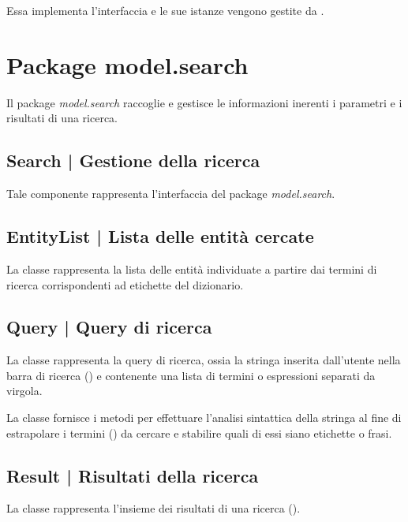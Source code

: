 \documentclass[10pt,a4paper,headinclude,footinclude,hidelinks]{scrreprt} %
\begin{document}
	Essa implementa l'interfaccia \textit{} e le sue istanze vengono gestite da \textit{}.

	\section{Package model.search}
	\label{sec:stage:design:sistema:model.search}
	Il package \textit{model.search} raccoglie e gestisce le informazioni inerenti i parametri e i risultati di una ricerca. 

	\subsection[Search]{Search | Gestione della ricerca}
	\label{sec:stage:design:sistema:model.search:search}
	Tale componente rappresenta l'interfaccia del package \textit{model.search}.

	\subsection[EntityList]{EntityList | Lista delle entità cercate}
	\label{sec:stage:design:sistema:model.search:search-entity-list}
	La classe \textit{} rappresenta la lista delle entità individuate a partire dai termini di ricerca corrispondenti ad etichette del dizionario.

	\subsection[Query]{Query | Query di ricerca}
	\label{sec:stage:design:sistema:model.search:search-query}
	La classe \textit{} rappresenta la query di ricerca, ossia la stringa inserita dall'utente nella barra di ricerca (\textit{}) e contenente una lista di termini o espressioni separati da virgola.

	La classe fornisce i metodi per effettuare l'analisi sintattica della stringa al fine di estrapolare i termini (\textit{}) da cercare e stabilire quali di essi siano etichette o frasi.

	\subsection[Result]{Result | Risultati della ricerca}
	\label{sec:stage:design:sistema:model.search:search-result}
	La classe \textit{} rappresenta l'insieme dei risultati di una ricerca (\textit{}).
\end{document}
